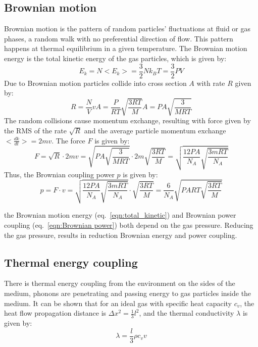 \documentclass[\main/master.tex]{subfiles}
\begin{document}
\subsection{Brownian motion}
Brownian motion is the pattern of random particles' fluctuations at fluid or gas phases, a random walk with no preferential direction of flow. This pattern happens at thermal equilibrium in a given temperature. The  Brownian motion energy is the total kinetic energy of the gas particles, which is given by:
\begin{equation}
E_k = N<E_k> =\frac{3}{2}N k_B T = \frac{3}{2}PV    \label{eqn:total_kinetic}
\end{equation}
Due to Brownian motion particles collide into cross section $A$ with rate $R$ given by:
\begin{equation}
R = \frac{N}{V} v A = \frac{P}{RT} \sqrt{\frac{3RT}{M}} A = PA\sqrt{\frac{3}{MRT}}   \label{eqn:collision rate}
\end{equation}
The random collisions cause momentum exchange, resulting with force given by the RMS of the rate $\sqrt{R}$ and the average particle momentum exchange $<\frac{dk}{dt}> =2mv$. The force $F$ is given by: 
\begin{equation}
F  = \sqrt{R}\cdot 2mv= \sqrt{PA\sqrt{\frac{3}{MRT}}}\cdot 2m\sqrt{\frac{3RT}{M}} = \sqrt{\frac{12PA}{N_A}\sqrt{\frac{3mRT}{N_A}} }     \label{eqn:Brownian coupling}
\end{equation}
Thus, the Brownian coupling power $p$ is given by:  
\begin{equation}
p = F\cdot v = \sqrt{\frac{12PA}{N_A}\sqrt{\frac{3mRT}{N_A}} }\cdot\sqrt{\frac{3RT}{M}} = \frac{6}{N_A}\sqrt{PART\sqrt{\frac{3RT}{M}} }
    \label{eqn:Brownian power}
\end{equation}
\par\noindent
the Brownian motion energy (eq.~\ref{eqn:total_kinetic}) and Brownian power coupling (eq.~\ref{eqn:Brownian power}) both depend on the gas pressure. Reducing the gas pressure, results in reduction Brownian energy and power coupling. 
\subsection{Thermal energy coupling}
There is thermal energy coupling from the environment on the sides of the medium, phonons are penetrating and passing energy to gas particles inside the medium. It can be shown that for an ideal gas with specific heat capacity $c_v$, the heat flow propagation distance is $\Delta x ^2  = \frac{1}{3} l^2 $, and the thermal conductivity $\lambda$ is given by:
\begin{equation}
\lambda  = \frac{l}{3}\rho c_v v    \label{eqn:heat conduction coefficient}
\end{equation}
\end{document}
